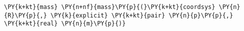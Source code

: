 \begin{Verbatim}[commandchars=\\\{\}]
    \PY{k+kt}{mass} \PY{n+nf}{mass}\PY{p}{(}\PY{k+kt}{coordsys} \PY{n}{R}\PY{p}{,} \PY{k}{explicit} \PY{k+kt}{pair} \PY{n}{p}\PY{p}{,} \PY{k+kt}{real} \PY{n}{m}\PY{p}{)}
\end{Verbatim}
